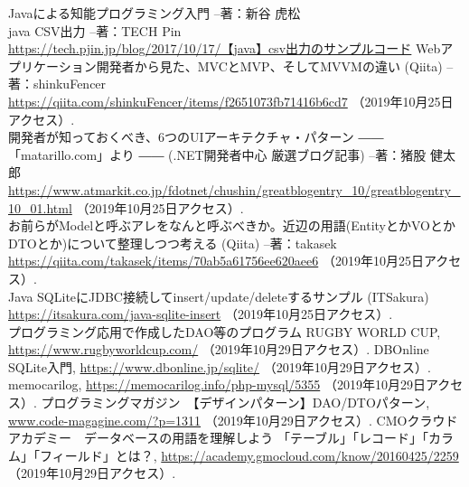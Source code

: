 \documentclass[12pt]{jarticle}
\begin{document}
\begin{thebibliography}{99}
 Javaによる知能プログラミング入門 --著：新谷 虎松 \\
 java CSV出力 --著：TECH Pin \\
\url{https://tech.pjin.jp/blog/2017/10/17/【java】csv出力のサンプルコード}
 Webアプリケーション開発者から見た、MVCとMVP、そしてMVVMの違い (Qiita) --著：shinkuFencer \\
\url{https://qiita.com/shinkuFencer/items/f2651073fb71416b6cd7} （2019年10月25日アクセス）. \\
 開発者が知っておくべき、6つのUIアーキテクチャ・パターン ―― 「matarillo.com」より ―― (.NET開発者中心 厳選ブログ記事) --著：猪股 健太郎 \\
\url{https://www.atmarkit.co.jp/fdotnet/chushin/greatblogentry_10/greatblogentry_10_01.html} （2019年10月25日アクセス）. \\
 お前らがModelと呼ぶアレをなんと呼ぶべきか。近辺の用語(EntityとかVOとかDTOとか)について整理しつつ考える (Qiita) --著：takasek \\
\url{https://qiita.com/takasek/items/70ab5a61756ee620aee6} （2019年10月25日アクセス）. \\
 Java SQLiteにJDBC接続してinsert/update/deleteするサンプル (ITSakura) \\
\url{https://itsakura.com/java-sqlite-insert} （2019年10月25日アクセス）. \\
 プログラミング応用で作成したDAO等のプログラム
 RUGBY WORLD CUP, \url{https://www.rugbyworldcup.com/} （2019年10月29日アクセス）.
 DBOnline SQLite入門, \url{https://www.dbonline.jp/sqlite/} （2019年10月29日アクセス）.
 memocarilog, \url{https://memocarilog.info/php-mysql/5355} （2019年10月29日アクセス）.
 プログラミングマガジン　【デザインパターン】DAO/DTOパターン, \url{www.code-magagine.com/?p=1311} （2019年10月29日アクセス）.
 CMOクラウドアカデミー　データベースの用語を理解しよう 「テーブル」「レコード」「カラム」「フィールド」とは？, \url{https://academy.gmocloud.com/know/20160425/2259} （2019年10月29日アクセス）.
\end{thebibliography}
\end{document}
